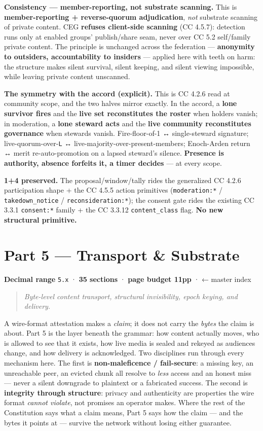\documentclass[11pt]{article}
\begin{document}
\textbf{Consistency — member-reporting, not substrate scanning.} This is \textbf{member-reporting + reverse-quorum adjudication}, \textit{not} substrate scanning of private content. CEG \textbf{refuses client-side scanning} (CC 4.5.7): detection runs only at enabled groups' publish/share seam, never over CC 5.2 self/family private content. The principle is unchanged across the federation — \textbf{anonymity to outsiders, accountability to insiders} — applied here with teeth on harm: the structure makes silent survival, silent keeping, and silent viewing impossible, while leaving private content unscanned.


\textbf{The symmetry with the accord (explicit).} This is CC 4.2.6 read at community scope, and the two halves mirror exactly. In the accord, a \textbf{lone survivor fires} and the \textbf{live set reconstitutes the roster} when holders vanish; in moderation, a \textbf{lone steward acts} and the \textbf{live community reconstitutes governance} when stewards vanish. Fire-floor-of-1 ↔ single-steward signature; live-quorum-over-\texttt{L} ↔ live-majority-over-present-members; Enoch-Arden return ↔ merit re-auto-promotion on a lapsed steward's silence. \textbf{Presence is authority, absence forfeits it, a timer decides} — at every scope.


\textbf{1+4 preserved.} The proposal/window/tally rides the generalized CC 4.2.6 participation shape + the CC 4.5.5 action primitives (\texttt{moderation:*} / \texttt{takedown\_notice} / \texttt{reconsideration:*}); the consent gate rides the existing CC 3.3.1 \texttt{consent:*} family + the CC 3.3.12 \texttt{content\_class} flag. \textbf{No new structural primitive.}


\clearpage
\section*{Part 5 — Transport \& Substrate}


\textbf{Decimal range} \texttt{5.x} · \textbf{35 sections} · \textbf{page budget 11pp} · ← master index


\begin{quote}\itshape Byte-level content transport, structural invisibility, epoch keying, and delivery.\end{quote}



A wire-format attestation makes a \textit{claim}; it does not carry the \textit{bytes} the claim is about. Part 5 is the layer beneath the grammar: how content actually moves, who is allowed to see that it exists, how live media is sealed and rekeyed as audiences change, and how delivery is acknowledged. Two disciplines run through every mechanism here. The first is \textbf{non-maleficence / fail-secure}: a missing key, an unreachable peer, an evicted chunk all resolve to \textit{less} access and an honest miss — never a silent downgrade to plaintext or a fabricated success. The second is \textbf{integrity through structure}: privacy and authenticity are properties the wire format \textit{cannot violate}, not promises an operator makes. Where the rest of the Constitution says what a claim means, Part 5 says how the claim — and the bytes it points at — survive the network without losing either guarantee.
\end{document}
